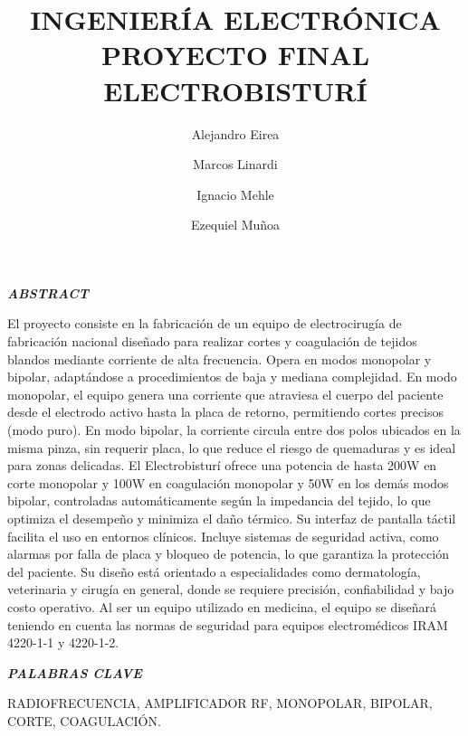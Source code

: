 \documentclass[10pt, conference, final, twocolumn, sansserif]{IEEEtran}
\renewenvironment{abstract}{\normalfont\small\itshape\noindent\textbf{\textit{ABSTRACT}}
}{\vspace{1ex}}
\renewenvironment{IEEEkeywords}{\normalfont\small\noindent\textbf{\textit{PALABRAS CLAVE}}
}{}
\begin{document}
\title{ INGENIERÍA ELECTRÓNICA \\ 
        PROYECTO FINAL \\
        ELECTROBISTURÍ}
\author{Alejandro Eirea \and
        Marcos Linardi \and
        Ignacio Mehle \and
        Ezequiel Muñoa}
\maketitle

\begin{abstract}
El proyecto consiste en la fabricación de un equipo de electrocirugía de fabricación nacional diseñado para realizar cortes y coagulación de tejidos blandos mediante corriente de alta frecuencia. Opera en modos monopolar y bipolar, adaptándose a procedimientos de baja y mediana complejidad. En modo monopolar, el equipo genera una corriente que atraviesa el cuerpo del paciente desde el electrodo activo hasta la placa de retorno, permitiendo cortes precisos (modo puro). En modo bipolar, la corriente circula entre dos polos ubicados en la misma pinza, sin requerir placa, lo que reduce el riesgo de quemaduras y es ideal para zonas delicadas.
El Electrobisturí ofrece una potencia de hasta 200W en corte monopolar y 100W en coagulación monopolar y 50W en los demás modos bipolar, controladas automáticamente según la impedancia del tejido, lo que optimiza el desempeño y minimiza el daño térmico. Su interfaz de pantalla táctil facilita el uso en entornos clínicos. Incluye sistemas de seguridad activa, como alarmas por falla de placa y bloqueo de potencia, lo que garantiza la protección del paciente. Su diseño está orientado a especialidades como dermatología,  veterinaria y cirugía en general, donde se requiere precisión, confiabilidad y bajo costo operativo. Al ser un equipo utilizado en medicina, el equipo se diseñará teniendo en cuenta las normas de seguridad para equipos electromédicos  IRAM 4220-1-1 y 4220-1-2.
\end{abstract}

\begin{IEEEkeywords}
RADIOFRECUENCIA, AMPLIFICADOR RF, MONOPOLAR, BIPOLAR, CORTE, COAGULACIÓN.
\end{IEEEkeywords}

\tableofcontents

\pagestyle{fancy}
\thispagestyle{IEEEtitlepagestyle}
\end{document}
